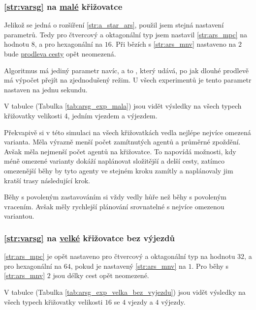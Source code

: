 \subsubsection{\ref{str:varsg} na \hyperref[par:data_mala]{malé} křižovatce}
\label{subsubsec:exp_arsg_mala_krizovatka}

Jelikož se jedná o rozšíření \ref{str:a_star_ars}, použil jsem stejná nastavení parametrů.
Tedy pro čtvercový a oktagonální typ jsem nastavil \ref{str:ars_mpc} na hodnotu $8$, a pro hexagonální na $16$.
Při bězích s \ref{str:ars_mnv} nastaveno na $2$ bude \hyperref[par:ars_mpc]{prodleva cesty} opět neomezená.

Algoritmus má jediný parametr navíc, a to , který udává,
po jak dlouhé prodlevě má výpočet přejít na zjednodušený režim.
U všech experimentů je tento parametr nastaven na jednu sekundu.

V tabulce (Tabulka \ref{tab:arsg_exp_mala}) jsou vidět výsledky na všech typech křižovatky
velikosti 4, jedním vjezdem a výjezdem.

Překvapivě si v této simulaci na všech křižovatkách vedla nejlépe nejvíce omezená varianta.
Měla výrazně menší počet zamítnutých agentů a průměrné zpoždění.
Avšak měla nejmenší počet agentů na křižovatce.
To napovídá možnosti, kdy méně omezené varianty dokáží naplánovat složitější a delší cesty,
zatímco omezenější běhy by tyto agenty ve stejném kroku zamítly a naplánovaly jim kratší trasy následující krok.

Běhy s povoleným zastavováním si vždy vedly hůře než běhy s povoleným vracením.
Avšak měly rychlejší plánování srovnatelné s nejvíce omezenou variantou.



\subsubsection{\ref{str:varsg} na \hyperref[par:data_velka]{velké} křižovatce bez výjezdů}
\label{subsubsec:exp_arsg_velka_krizovatka_bez_vyjezdu}

\ref{str:ars_mpc} je opět nastaveno pro čtvercový a oktagonální typ na hodnotu $32$,
a pro hexagonální na $64$, pokud je nastavený \ref{str:ars_mnv} na $1$.
Pro běhy s \ref{str:ars_mnv} $2$ jsou délky cest opět neomezené.

V tabulce (Tabulka \ref{tab:arsg_exp_velka_bez_vyjezdu}) jsou vidět výsledky na všech typech křižovatky
velikosti $16$ se $4$ vjezdy a $4$ výjezdy.

